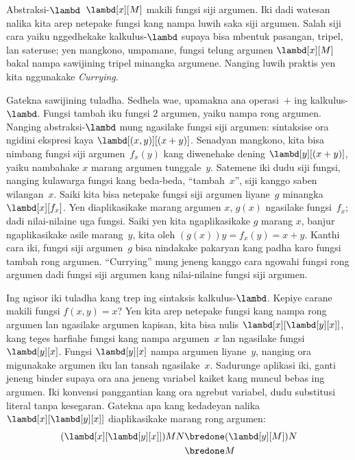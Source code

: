 \documentclass[../../../include/open-logic-section]{subfiles}
\begin{document}

Abstraksi-$\lambd$~$\lambd[x][M]$ makili fungsi
siji argumen. Iki dadi watesan nalika kita arep
netepake fungsi kang nampa luwih saka siji argumen.
Salah siji cara yaiku nggedhekake kalkulus-$\lambd$
supaya bisa mbentuk pasangan, tripel, lan sateruse;
yen mangkono, umpamane, fungsi telung argumen
$\lambd[x][M]$ bakal nampa sawijining tripel
minangka argumene. Nanging luwih praktis yen
kita nggunakake \emph{Currying}.

Gatekna sawijining tuladha. Sedhela wae, upamakna
ana operasi~$+$ ing kalkulus-$\lambd$.
Fungsi tambah iku fungsi $2$ argumen, yaiku
nampa rong argumen. Nanging abstraksi-$\lambd$
mung ngasilake fungsi siji argumen: sintaksise
ora ngidini ekspresi kaya
$\lambd[(x,y)][(x+y)]$. Senadyan mangkono,
kita bisa nimbang fungsi siji argumen~$f_x(y)$
kang diwenehake dening $\lambd[y][(x+y)]$,
yaiku nambahake $x$ marang argumen tunggale~$y$.
Satemene iki dudu siji fungsi, nanging kulawarga
fungsi kang beda-beda, ``tambah~$x$'',
siji kanggo saben wilangan~$x$. Saiki kita bisa
netepake fungsi siji argumen liyane~$g$ minangka
$\lambd[x][f_x]$. Yen diaplikasikake marang
argumen $x$, $g(x)$ ngasilake fungsi~$f_x$;
dadi nilai-nilaine uga fungsi. Saiki yen
kita ngaplikasikake $g$ marang $x$, banjur
ngaplikasikake asile marang~$y$, kita oleh
$(g(x))y = f_x(y) = x+y$. Kanthi cara iki,
fungsi siji argumen~$g$ bisa nindakake pakaryan
kang padha karo fungsi tambah rong argumen.
``Currying'' mung jeneng kanggo cara
ngowahi fungsi rong argumen dadi fungsi siji
argumen kang nilai-nilaine fungsi siji argumen.

Ing ngisor iki tuladha kang trep ing sintaksis
kalkulus-$\lambd$. Kepiye carane makili
fungsi $f(x,y) = x$? Yen kita arep netepake
fungsi kang nampa rong argumen lan ngasilake
argumen kapisan, kita bisa nulis
$\lambd[x][\lambd[y][x]]$, kang teges
harfiahe fungsi kang nampa argumen~$x$
lan ngasilake fungsi~$\lambd[y][x]$.
Fungsi $\lambd[y][x]$ nampa argumen
liyane~$y$, nanging ora migunakake argumen
iku lan tansah ngasilake~$x$.
Sadurunge aplikasi iki, ganti jeneng binder supaya ora ana jeneng variabel kaiket kang muncul bebas ing argumen. Iki konvensi panggantian kang ora ngrebut variabel, dudu substitusi literal tanpa kesegaran. Gatekna apa kang kedadeyan nalika
$\lambd[x][\lambd[y][x]]$
diaplikasikake marang rong argumen:
\begin{align*}
  (\lambd[x][\lambd[y][x]])MN
  \bredone & (\lambd[y][M])N \\
  \bredone & M
\end{align*}
\end{document}
